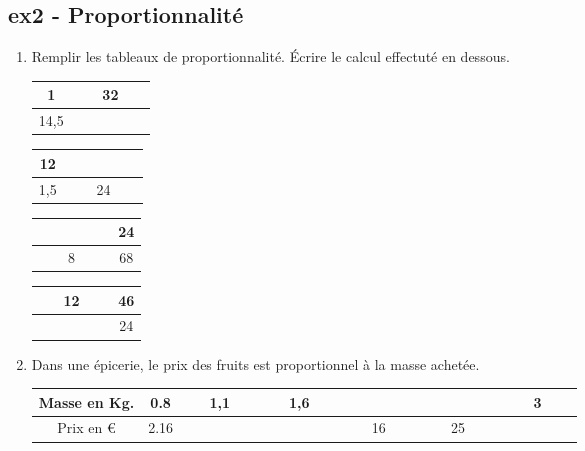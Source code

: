 \documentclass[12pt]{article}
\begin{document}
\subsection*{ex2 - Proportionnalité}

\begin{enumerate}
\item Remplir les tableaux de proportionnalité. Écrire le calcul effectuté en dessous.

  \begin{multicols}{4}\noindent
    \begin{center}
      \begin{tabular}{|c|c|}
        \hline
        1 & 32\\  \hline
        14,5 & $\phantom{azertyuiop}$\\  \hline
      \end{tabular}
    \end{center}
    \Pointilles[1]
    \begin{center}
      \begin{tabular}{|c|c|}
        \hline
        12 & $\phantom{azertyuiop}$\\  \hline
        1,5 & 24\\  \hline
      \end{tabular}
    \end{center}
    \Pointilles[1]
    \begin{center}
      \begin{tabular}{|c|c|}
        \hline
        $\phantom{azertyuiop}$  & 24\\  \hline
        8 & 68\\  \hline
      \end{tabular}
    \end{center}
    \Pointilles[1]
    \begin{center}
      \begin{tabular}{|c|c|}
        \hline
        12 & 46\\  \hline
        $\phantom{azertyuiop}$ & 24\\  \hline
      \end{tabular}
    \end{center}
    \Pointilles[1]
  \end{multicols}

\item Dans une épicerie, le prix des fruits est proportionnel à la masse achetée. 

  \begin{center}
    \begin{tabular}{|c|c|c|c|c|c|c|}
      \hline
      Masse en Kg.&  0.8 & 1,1 & 1,6 & $\phantom{azertyuiop}$   & $\phantom{azertyuiop}$   & 3 \\  \hline
      Prix en \euro & 2.16 & $\phantom{azertyuiop}$    & $\phantom{azertyuiop}$    & 16 & 25 & $\phantom{azertyuiop}$   \\  \hline
    \end{tabular}
  \end{center}


\end{enumerate}
\end{document}
